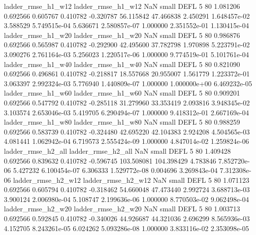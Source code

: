       ladder_rmse_h1_w12       ladder_rmse_h1_w12                   NaN      small     DEFL                 5 80 1.081206       0.692566 0.605767       0.410782   -0.320787     56.115842     47.466838     2.450291   1.648457e-02  3.588529 5.749515e-04     5.636671   2.580857e-07            1.000000    2.351552e-01        1.130415e-04
      ladder_rmse_h1_w20       ladder_rmse_h1_w20                   NaN      small     DEFL                 5 80 0.986876       0.692566 0.565987       0.410782   -0.292900     42.495600     37.782798     1.970898   5.223791e-02  3.090276 2.761164e-03     5.256023   1.220517e-06            1.000000    9.774519e-01        5.101761e-04
      ladder_rmse_h1_w40       ladder_rmse_h1_w40                   NaN      small     DEFL                 5 80 0.821090       0.692566 0.496861       0.410782   -0.218817     18.557668     20.955007     1.561779   1.223372e-01  3.063397 2.992324e-03     5.776940   1.440809e-07            1.000000    1.000000e+00        6.469232e-05
      ladder_rmse_h1_w60       ladder_rmse_h1_w60                   NaN      small     DEFL                 5 80 0.909201       0.692566 0.547792       0.410782   -0.285118     31.279960     33.353419     2.093816   3.948345e-02  3.103574 2.653046e-03     5.419705   6.290494e-07            1.000000    9.418312e-01        2.667169e-04
      ladder_rmse_h1_w80       ladder_rmse_h1_w80                   NaN      small     DEFL                 5 80 0.988259       0.692566 0.583739       0.410782   -0.324480     42.695220     42.104383     2.924208   4.504565e-03  4.081441 1.062942e-04     6.719573   2.555424e-09            1.000000    4.847014e-02        1.259824e-06
      ladder_rmse_h2_all       ladder_rmse_h2_all                   NaN      small     DEFL                 5 80 1.409428       0.692566 0.839632       0.410782   -0.596745    103.508081    104.398429     4.783846   7.852720e-06  5.427232 6.100454e-07     6.306333   1.529772e-08            0.004696    3.269843e-04        7.312308e-06
      ladder_rmse_h2_w12       ladder_rmse_h2_w12                   NaN      small     DEFL                 5 80 1.071123       0.692566 0.605794       0.410782   -0.318462     54.660048     47.473440     2.992724   3.688713e-03  3.900124 2.006980e-04     5.108747   2.199636e-06            1.000000    8.770503e-02        9.062498e-04
      ladder_rmse_h2_w20       ladder_rmse_h2_w20                   NaN      small     DEFL                 5 80 1.003713       0.692566 0.592845       0.410782   -0.340026     44.926687     44.321036     2.696299   8.565936e-03  4.152705 8.243261e-05     6.024262   5.093286e-08            1.000000    3.833116e-02        2.353098e-05
